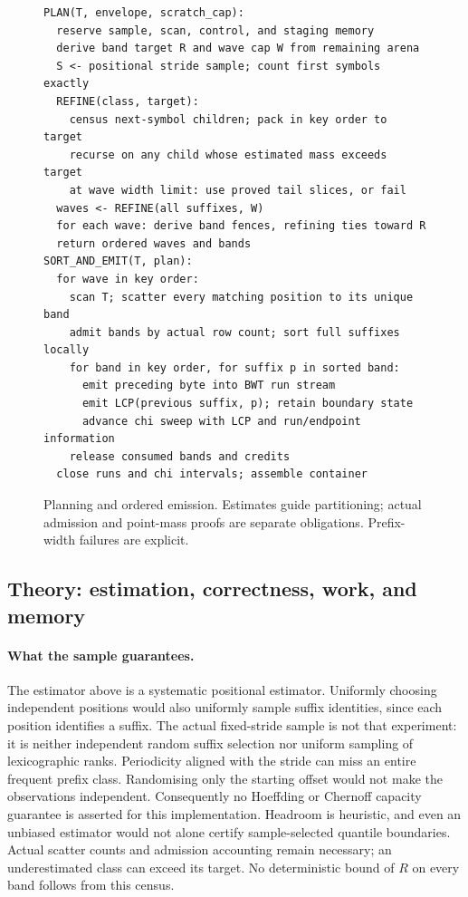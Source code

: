 \documentclass[10pt]{article}
\begin{document}
\begin{figure}[ht]
\small
\begin{verbatim}
PLAN(T, envelope, scratch_cap):
  reserve sample, scan, control, and staging memory
  derive band target R and wave cap W from remaining arena
  S <- positional stride sample; count first symbols exactly
  REFINE(class, target):
    census next-symbol children; pack in key order to target
    recurse on any child whose estimated mass exceeds target
    at wave width limit: use proved tail slices, or fail
  waves <- REFINE(all suffixes, W)
  for each wave: derive band fences, refining ties toward R
  return ordered waves and bands
SORT_AND_EMIT(T, plan):
  for wave in key order:
    scan T; scatter every matching position to its unique band
    admit bands by actual row count; sort full suffixes locally
    for band in key order, for suffix p in sorted band:
      emit preceding byte into BWT run stream
      emit LCP(previous suffix, p); retain boundary state
      advance chi sweep with LCP and run/endpoint information
    release consumed bands and credits
  close runs and chi intervals; assemble container
\end{verbatim}
\caption{Planning and ordered emission. Estimates guide partitioning; actual admission and
point-mass proofs are separate obligations. Prefix-width failures are explicit.}
\label{alg:radix}
\end{figure}

\subsection{Theory: estimation, correctness, work, and memory}
\label{sec:theory}
\paragraph{What the sample guarantees.}
The estimator above is a systematic positional estimator. Uniformly choosing independent
positions would also uniformly sample suffix identities, since each position identifies a
suffix. The actual fixed-stride sample is not that experiment: it is neither independent
random suffix selection nor uniform sampling of lexicographic ranks. Periodicity aligned
with the stride can miss an entire frequent prefix class. Randomising only the starting
offset would not make the observations independent. Consequently no Hoeffding or Chernoff
capacity guarantee is asserted for this implementation. Headroom is heuristic, and even an
unbiased estimator would not alone certify sample-selected quantile boundaries.
Actual scatter counts and admission accounting remain necessary; an underestimated class
can exceed its target. No deterministic bound of $R$ on every band follows from this census.
\end{document}
